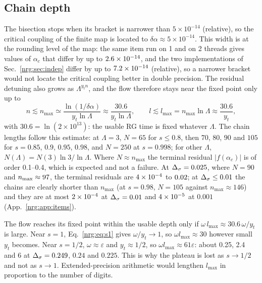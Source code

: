 \subsection{Chain depth}\label{nrg:sec:depth}
The bisection stops when its bracket is narrower than $5\times10^{-14}$ (relative), so the critical coupling of the finite map is
located to $\delta\alpha\approx5\times10^{-14}$. This width is at the rounding level of the map: the same item run on 1 and on 2 threads
gives values of $\alpha_c$ that differ by up to $2.6\times10^{-14}$, and the two implementations of Sec.~\ref{nrg:sec:indep} differ by up to
$7.2\times10^{-14}$ (relative), so a narrower bracket would not locate the critical coupling better in double precision. The residual
detuning also grows as $\Lambda^{y_tn}$, and the flow therefore stays near the fixed point only up to
\begin{equation}
n\lesssim n_{\max}\simeq\frac{\ln(1/\delta\alpha)}{y_t\ln\Lambda}\approx\frac{30.6}{y_t\ln\Lambda},\qquad
l\lesssim l_{\max}=n_{\max}\ln\Lambda\approx\frac{30.6}{y_t},\label{nrg:eq:nmax}
\end{equation}
with $30.6=\ln(2\times10^{13})$: the usable RG time is fixed whatever $\Lambda$. The chain lengths follow this estimate: at
$\Lambda=3$, $N=65$ for $s\le0.8$, then $70$, $80$, $90$ and $105$ for $s=0.85$, $0.9$, $0.95$, $0.98$, and $N=250$ at $s=0.998$; for
other $\Lambda$, $N(\Lambda)=N(3)\ln3/\ln\Lambda$. Where $N\approx n_{\max}$ the terminal residual $|f(\alpha_c)|$ is of order 0.1--0.4,
which is expected and not a failure. At $\Delta_\sigma=0.025$, where $N=90$ and $n_{\max}\approx97$, the terminal residuals are
$4\times10^{-4}$ to $0.02$; at $\Delta_\sigma\le0.01$ the chains are clearly shorter than $n_{\max}$ (at $s=0.98$, $N=105$
against $n_{\max}\approx146$) and they are at most $2\times10^{-4}$ at $\Delta_\sigma=0.01$ and $4\times10^{-5}$ at $0.001$ (App.~\ref{nrg:app:items}).

The flow reaches its fixed point within the usable depth only if $\omega\,l_{\max}\approx30.6\,\omega/y_t$ is large. Near $s=1$,
Eq.~\eqref{nrg:eq:s1} gives $\omega/y_t\to1$, so $\omega l_{\max}\approx30$ however small $y_t$ becomes. Near $s=1/2$, $\omega\approx\varepsilon$
and $y_t\approx1/2$, so $\omega l_{\max}\approx61\varepsilon$: about 0.25, 2.4 and 6 at $\Delta_\sigma=0.249$, $0.24$ and $0.225$. This is why the
plateau is lost as $s\to1/2$ and not as $s\to1$. Extended-precision arithmetic would lengthen $l_{\max}$ in proportion to the number of
digits.

